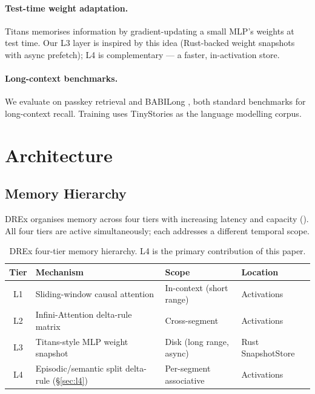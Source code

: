\documentclass{article}
\begin{document}
\paragraph{Test-time weight adaptation.}
Titans \citep{sun2024titans} memorises information by gradient-updating a small MLP's
weights at test time.  Our L3 layer is inspired by this idea (Rust-backed weight
snapshots with async prefetch); L4 is complementary — a faster, in-activation store.

\paragraph{Long-context benchmarks.}
We evaluate on passkey retrieval \citep{munkhdalai2024infini} and BABILong
\citep{schalk2024babilong}, both standard benchmarks for long-context recall.  Training
uses TinyStories \citep{eldan2023tinystories} as the language modelling corpus.

\section{Architecture}
\label{sec:arch}

\subsection{Memory Hierarchy}
\label{sec:hierarchy}

DREx organises memory across four tiers with increasing latency and capacity
().  All four tiers are active simultaneously; each addresses a
different temporal scope.

\begin{table}[h]
  \centering
  \small
  \caption{DREx four-tier memory hierarchy.  L4 is the primary contribution of this paper.}
  \label{tab:hierarchy}
  \begin{tabular}{clll}
    \toprule
    \textbf{Tier} & \textbf{Mechanism} & \textbf{Scope} & \textbf{Location} \\
    \midrule
    L1 & Sliding-window causal attention & In-context (short range) & Activations \\
    L2 & Infini-Attention delta-rule matrix \citep{munkhdalai2024infini}
       & Cross-segment & Activations \\
    L3 & Titans-style MLP weight snapshot \citep{sun2024titans}
       & Disk (long range, async) & Rust SnapshotStore \\
    L4 & Episodic/semantic split delta-rule (\S\ref{sec:l4})
       & Per-segment associative & Activations \\
    \bottomrule
  \end{tabular}
\end{table}
\end{document}
